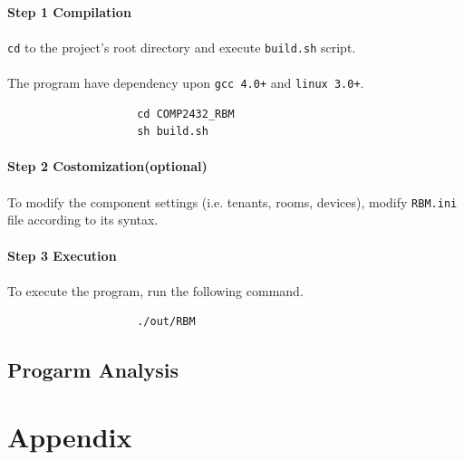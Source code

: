 \documentclass{article}
\begin{document}
            \paragraph{Step 1 Compilation}
            \paragraph{}
                \texttt{cd} to the project's root directory and execute \texttt{build.sh} script.
            \paragraph{}
                The program have dependency upon \texttt{gcc 4.0+} and \texttt{linux 3.0+}.
                \begin{verbatim}
                    cd COMP2432_RBM
                    sh build.sh
                \end{verbatim}
            \paragraph{Step 2 Costomization(optional)}
            \paragraph{}
                To modify the component settings (i.e. tenants, rooms, devices),
                modify \texttt{RBM.ini} file according to its syntax.
            \paragraph{Step 3 Execution}
            \paragraph{}
                To execute the program, run the following command.
                \begin{verbatim}
                    ./out/RBM
                \end{verbatim}

        \subsection{Progarm Analysis}

    \cleardoublepage
    \section{Appendix}
\end{document}
